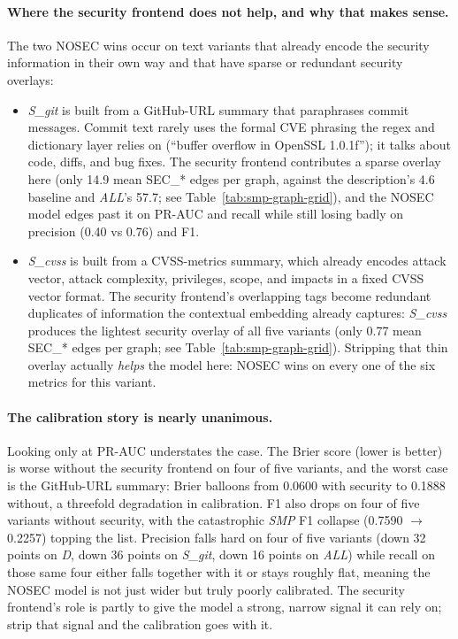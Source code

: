 \documentclass[11pt,a4paper]{article}
\begin{document}
\paragraph{Where the security frontend does not help, and
            why that makes sense.}
The two NOSEC wins occur on text variants that already
encode the security information in their own way and that
have sparse or redundant security overlays:

\begin{itemize}[leftmargin=*, itemsep=0pt]
    \item \emph{S\_git} is built from a GitHub-URL summary
    that paraphrases commit messages. Commit text rarely
    uses the formal CVE phrasing the regex and dictionary
    layer relies on (``buffer overflow in OpenSSL
    1.0.1f''); it talks about code, diffs, and bug fixes.
    The security frontend contributes a sparse overlay
    here (only 14.9 mean SEC\_* edges per graph, against
    the description's 4.6 baseline and \emph{ALL}'s 57.7;
    see Table~\ref{tab:smp-graph-grid}), and the NOSEC
    model edges past it on PR-AUC and recall while still
    losing badly on precision (0.40 vs 0.76) and F1.
    \item \emph{S\_cvss} is built from a CVSS-metrics
    summary, which already encodes attack vector, attack
    complexity, privileges, scope, and impacts in a fixed
    CVSS vector format. The security frontend's
    overlapping tags become redundant duplicates of
    information the contextual embedding already
    captures: \emph{S\_cvss} produces the lightest
    security overlay of all five variants (only 0.77 mean
    SEC\_* edges per graph; see
    Table~\ref{tab:smp-graph-grid}). Stripping that thin
    overlay actually \emph{helps} the model here: NOSEC
    wins on every one of the six metrics for this
    variant.
\end{itemize}

\paragraph{The calibration story is nearly unanimous.}
Looking only at PR-AUC understates the case. The Brier
score (lower is better) is worse without the security
frontend on four of five variants, and the worst case is
the GitHub-URL summary: Brier balloons from 0.0600 with
security to 0.1888 without, a threefold degradation in
calibration. F1 also drops on four of five variants
without security, with the catastrophic \emph{SMP} F1
collapse (0.7590 $\to$ 0.2257) topping the list. Precision
falls hard on four of five variants (down 32 points on
\emph{D}, down 36 points on \emph{S\_git}, down 16 points
on \emph{ALL}) while recall on those same four either
falls together with it or stays roughly flat, meaning
the NOSEC model is not just wider but truly poorly
calibrated. The security frontend's role is partly to
give the model a strong, narrow signal it can rely on;
strip that signal and the calibration goes with it.
\end{document}
